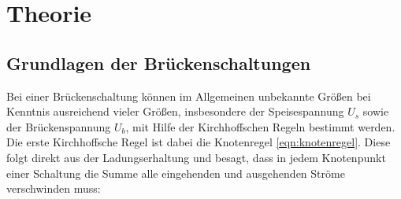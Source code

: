 \section{Theorie}
\subsection{Grundlagen der Brückenschaltungen}
\label{sec:Theorie}
Bei einer Brückenschaltung können im Allgemeinen unbekannte Größen bei Kenntnis ausreichend vieler Größen, insbesondere der Speisespannung $U_s$ sowie der Brückenspannung $U_b$, mit Hilfe der Kirchhoffschen Regeln bestimmt werden.\\
Die erste Kirchhoffsche Regel ist dabei die Knotenregel \eqref{eqn:knotenregel}.
Diese folgt direkt aus der Ladungserhaltung und besagt, dass in jedem Knotenpunkt einer Schaltung die Summe alle eingehenden und ausgehenden Ströme verschwinden muss:

